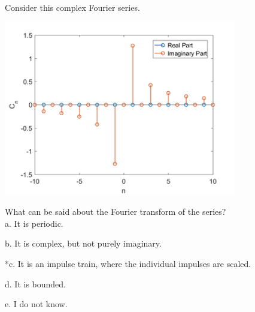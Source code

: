 
Consider this complex Fourier series.

\includegraphics[width=4in,height=3in]{../../Images/FrequencyDomainQ4.png}

What can be said about the Fourier transform of the series?\\

a. It is periodic.

b. It is complex, but not purely imaginary.

*c. It is an impulse train, where the individual impulses are scaled.

d. It is bounded.

e. I do not know.\\
